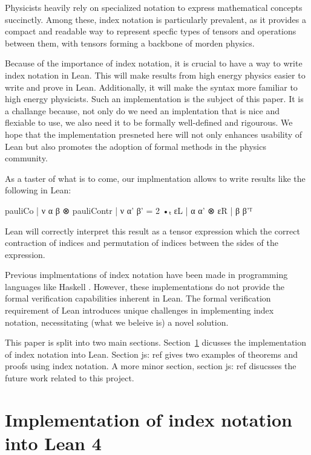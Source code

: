 \documentclass[a4paper, 11pt]{article}
\newcommand{\js}[1]{ {\color{magenta} js:  #1}}
\begin{document}
Physicists heavily rely on specialized notation to express mathematical concepts succinctly. 
Among these, index notation is particularly prevalent,
 as it provides a compact and readable way to represent specfic types of tensors and operations
 between them, with tensors forming a backbone of morden physics. 

Because of the importance of index notation, it is crucial to have a way to write index notation in Lean. 
This will make results from high energy physics easier to write and prove in Lean. 
Additionally, it will make the syntax more familiar to high energy physicists.
Such an implementation is the subject of this paper. 
It is a challange because, not only do we need an implentation that is nice and flexiable to use, 
we also need it to be formally well-defined and rigourous. 
We hope that the implementation presneted here will
not only enhances usability of Lean but also promotes the adoption of formal methods in the 
physics community.

As a taster of what is to come, our implmentation allows to write results like the following in 
Lean:
\begin{code}
{pauliCo | ν α β ⊗ pauliContr | ν α' β' = 2 •ₜ εL | α α' ⊗ εR | β β'}ᵀ
\end{code}
Lean will correctly interpret this result as a tensor expression which the correct contraction of indices 
and permutation of indices between the sides of the expression.

Previous implmentations of index notation have been made in programming languages like Haskell 
\cite{ref}. However, these implementations do not
 provide the formal verification capabilities inherent in Lean. 
 The formal verification requirement of Lean introduces unique challenges in implementing index 
 notation, necessitating (what we beleive is) a novel solution.

This paper is split into two main sections. Section~\ref{sec:Implementation} dicusses 
the implementation of index notation into Lean. Section \js{ref} gives two examples 
of theorems and proofs using index notation. A more minor section, section \js{ref} disucsses 
the future work related to this project.

\section{Implementation of index notation into Lean 4}\label{sec:Implementation}
\end{document}
